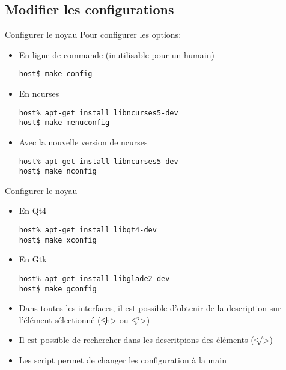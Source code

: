 \subsection{Modifier les configurations}
\begin{frame}[fragile=singleslide]{Configurer le noyau}
 Pour configurer les options:
 \begin{itemize}    
 \item En ligne de commande (inutilisable pour un humain)
   \begin{lstlisting}
host$ make config
   \end{lstlisting} %
 \item En ncurses
   \begin{lstlisting}
host% apt-get install libncurses5-dev
host$ make menuconfig
   \end{lstlisting} %
 \item Avec la nouvelle version de ncurses 
   \begin{lstlisting}
host% apt-get install libncurses5-dev
host$ make nconfig
   \end{lstlisting} %
\end{itemize} 
\end{frame} 

\begin{frame}[fragile=singleslide]{Configurer le noyau}
\begin{itemize} 
 \item En Qt4
   \begin{lstlisting}
host% apt-get install libqt4-dev
host$ make xconfig
   \end{lstlisting} %
 \item En Gtk
   \begin{lstlisting}
host% apt-get install libglade2-dev
host$ make gconfig
   \end{lstlisting} %
 \item Dans toutes les interfaces,  il est possible d'obtenir de la
   description sur l'élément sélectionné (\c{<h>} ou \c{<?>})
 \item  Il est  possible de  rechercher dans  les  descritpions des
   éléments (\c{</>})
 \item  Les  script    permet  de  changer  les
   configuration à la main
 \end{itemize}
\end{frame}

